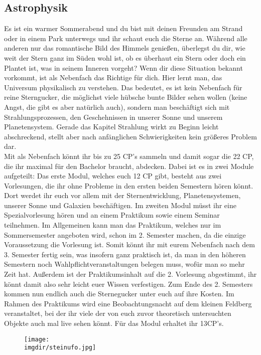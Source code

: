 \subsection{Astrophysik}
\label{subsec:astro}
Es ist ein warmer Sommerabend und du bist mit deinen Freunden am Strand oder in einem Park unterwegs und ihr schaut euch die Sterne an. Während alle anderen nur das romantische Bild des Himmels genie\ss en, überlegst du dir, wie weit der Stern ganz im Süden wohl ist, ob es überhaut ein Stern oder doch ein Plantet ist, was in seinem Inneren vorgeht? Wenn dir diese Situation bekannt vorkommt, ist  als Nebenfach das Richtige für dich. Hier lernt man, das Universum physikalisch zu verstehen. Das bedeutet, es ist kein Nebenfach für reine Sterngucker, die möglichst viele hübsche bunte Bilder sehen wollen (keine Angst, die gibt es aber natürlich auch), sondern man beschäftigt sich mit Strahlungsprozessen, den Geschehnissen in unserer Sonne und unserem Planetensystem. Gerade das Kapitel Strahlung wirkt zu Beginn leicht abschreckend, stellt aber nach anfänglichen Schwierigkeiten kein grö\ss eres Problem dar.\\
Mit  als Nebenfach könnt ihr bis zu 25 CP's sammeln und damit sogar die 22 CP, die ihr maximal für den Bachelor braucht, abdecken. Dabei ist es in zwei Module aufgeteilt: Das erste Modul, welches euch 12 CP gibt, besteht aus zwei Vorlesungen, die ihr ohne Probleme in den ersten beiden Semestern hören könnt. Dort werdet ihr euch vor allem mit der Sternentwicklung, Planetensystemen, unserer Sonne und Galaxien beschäftigen. Im zweiten Modul müsst ihr eine Spezialvorlesung hören und an einem Praktikum sowie einem Seminar teilnehmen. Im Allgemeinen kann man das Praktikum, welches nur im Sommersemester angeboten wird, schon im 2. Semester machen, da die einzige Voraussetzung die  Vorlesung ist. Somit könnt ihr mit eurem Nebenfach nach dem 3. Semester fertig sein, was insofern ganz praktisch ist, da man in den höheren Semestern noch Wahlpflichtveranstaltungen belegen muss, wofür man so mehr Zeit hat. Au\ss erdem ist der Praktikumsinhalt auf die 2. Vorlesung abgestimmt, ihr könnt damit also sehr leicht euer Wissen verfestigen. Zum Ende des 2. Semesters kommen nun endlich auch die Sternegucker unter euch auf ihre Kosten. Im Rahmen des Praktikums wird eine Beobachtungsnacht auf dem kleinen Feldberg veranstaltet, bei der ihr viele der von euch zuvor theoretisch untersuchten Objekte auch mal live sehen könnt. Für das Modul  erhaltet ihr 13CP's.
\begin{figure}[!t]
 	\centering
  	\texttt{[image: \\imgdir/steinufo.jpg]}
\end{figure}